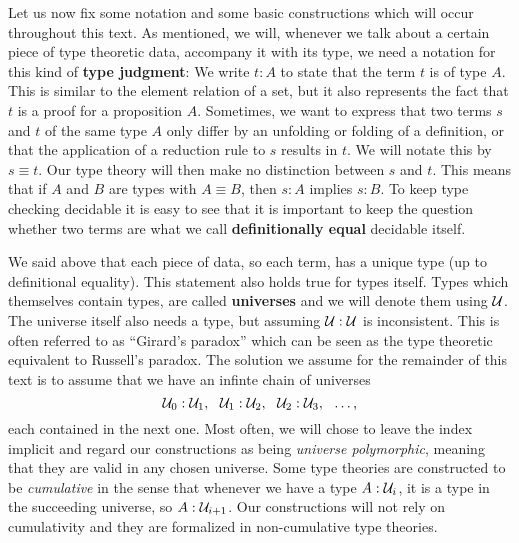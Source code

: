 Let us now fix some notation and some basic constructions which will occur
throughout this text.
As mentioned, we will, whenever we talk about a certain piece of type theoretic
data, accompany it with its type,
we need a notation for this kind of \textbf{type judgment}:
We write $t : A$ to state that the term $t$ is of type $A$.
This is similar to the element relation of a set, but it also represents the fact
that $t$ is a proof for a proposition $A$.
Sometimes, we want to express that two terms $s$ and $t$ of the same type $A$
only differ by an unfolding or folding of a definition, or that the application of
a reduction rule to $s$ results in $t$.
We will notate this by $s \equiv t$.
Our type theory will then make no distinction between $s$ and $t$.
This means that if $A$ and $B$ are types with $A \equiv B$, then
$s : A$ implies $s : B$.
To keep type checking decidable it is easy to see that it is important
to keep the question whether two terms are what we call \textbf{definitionally equal}
decidable itself.

We said above that each piece of data, so each term,
has a unique type (up to definitional equality).
This statement also holds true for types itself.
Types which themselves contain types, are called \textbf{universes} and we will
denote them using $\mathcal{U}$.
The universe itself also needs a type, but
assuming $\mathcal{U} : \mathcal{U}$ is inconsistent.
This is often referred to as
``Girard's paradox'' \citep{girard72,hurkens95} which can be seen as the type theoretic equivalent
to Russell's paradox.
The solution we assume for the remainder of this text is
to assume that we have an infinte chain of universes
\begin{equation*}
\mathcal{U}_0 : \mathcal{U}_1,~~ \mathcal{U}_1 : \mathcal{U}_2,~~ \mathcal{U}_2 : \mathcal{U}_3,~~ \ldots \text{,}
\end{equation*}
each contained in the next one.
Most often, we will chose to leave the index implicit and regard our constructions
as being \emph{universe polymorphic}, meaning that they are valid in any chosen
universe.
Some type theories are constructed to be \emph{cumulative} in the sense that whenever
we have a type $A : \mathcal{U}_i$, it is a type in the succeeding universe, so $A : \mathcal{U}_{i+1}$.
Our constructions will not rely on cumulativity and they are formalized in
non-cumulative type theories.


